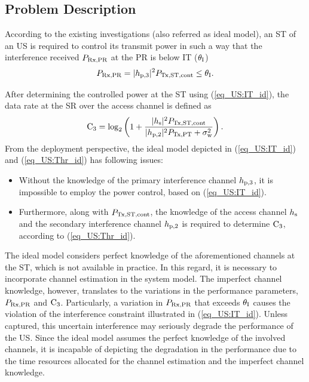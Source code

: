\subsection{Problem Description} \label{ssec_US:pd}
According to the existing investigations (also referred as ideal model), an ST of an US is required to control its transmit power in such a way that the interference received $P_{\text{Rx,PR}}$ at the PR is below IT ($\theta_{\text{I}}$) \cite{Xing07}
\begin{equation}
P_{\text{Rx,PR}} = |h_{\text{p,3}}|^2 P_{\text{Tx,ST,cont}} \le \theta_{\text{I}}.
\label{eq_US:IT_id}
\end{equation}

After determining the controlled power at the ST using (\ref{eq_US:IT_id}), the data rate at the SR over the access channel is defined as
\begin{equation}
\text{C}_{\text{3}} = \log_2 \left(1 + \frac{|h_{\text{s}}|^2 P_{\text{Tx,ST,cont}}}{ |h_{\text{p,2}}|^2 P_{\text{Tx,PT}} + \sigma^2_{\text{w}}} \right). 
\label{eq_US:Thr_id}
\end{equation}
From the deployment perspective, the ideal model depicted in (\ref{eq_US:IT_id}) and (\ref{eq_US:Thr_id}) has following issues:
\begin{itemize}
\item Without the knowledge of the primary interference channel $h_{\text{p,3}}$, it is impossible to employ the power control, based on (\ref{eq_US:IT_id}). 
\item Furthermore, along with $P_{\text{Tx,ST,cont}}$, the knowledge of the access channel $h_{\text{s}}$ and the secondary interference channel $h_{\text{p,2}}$ is required to determine $\text{C}_{\text{3}}$, according to (\ref{eq_US:Thr_id}).
\end{itemize}
The ideal model considers perfect knowledge of the aforementioned channels at the ST, which is not available in practice. In this regard, it is necessary to incorporate channel estimation in the system model. The imperfect channel knowledge, however, translates to the variations in the performance parameters, $P_{\text{Rx,PR}}$ and $\text{C}_{\text{3}}$. Particularly, a variation in $P_{\text{Rx,PR}}$ that exceeds $\theta_{\text{I}}$ causes the violation of the interference constraint illustrated in (\ref{eq_US:IT_id}). Unless captured, this uncertain interference may seriously degrade the performance of the US. Since the ideal model assumes the perfect knowledge of the involved channels, it is incapable of depicting the degradation in the performance due to the time resources allocated for the channel estimation and the imperfect channel knowledge. %

